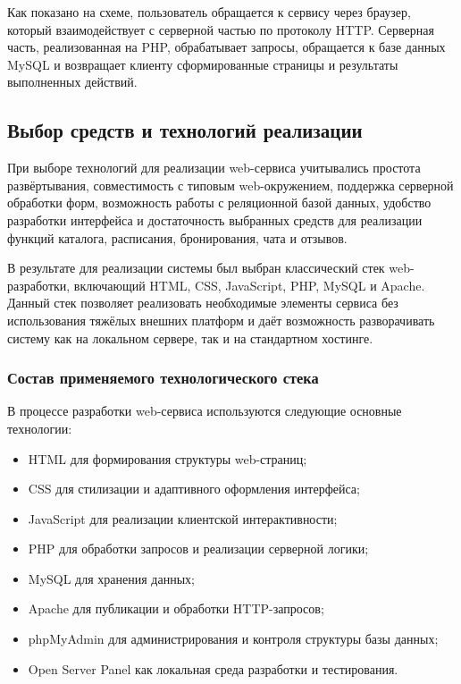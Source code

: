 Как показано на схеме, пользователь обращается к сервису через браузер, который взаимодействует с серверной частью по протоколу HTTP. Серверная часть, реализованная на PHP, обрабатывает запросы, обращается к базе данных MySQL и возвращает клиенту сформированные страницы и результаты выполненных действий.

\subsection{Выбор средств и технологий реализации}

При выборе технологий для реализации web-сервиса учитывались простота развёртывания, совместимость с типовым web-окружением, поддержка серверной обработки форм, возможность работы с реляционной базой данных, удобство разработки интерфейса и достаточность выбранных средств для реализации функций каталога, расписания, бронирования, чата и отзывов.

В результате для реализации системы был выбран классический стек web-разработки, включающий HTML, CSS, JavaScript, PHP, MySQL и Apache. Данный стек позволяет реализовать необходимые элементы сервиса без использования тяжёлых внешних платформ и даёт возможность разворачивать систему как на локальном сервере, так и на стандартном хостинге.

\subsubsection{Состав применяемого технологического стека}

В процессе разработки web-сервиса используются следующие основные технологии:
\begin{itemize}
	\item HTML для формирования структуры web-страниц;
	\item CSS для стилизации и адаптивного оформления интерфейса;
	\item JavaScript для реализации клиентской интерактивности;
	\item PHP для обработки запросов и реализации серверной логики;
	\item MySQL для хранения данных;
	\item Apache для публикации и обработки HTTP-запросов;
	\item phpMyAdmin для администрирования и контроля структуры базы данных;
	\item Open Server Panel как локальная среда разработки и тестирования.
\end{itemize}

